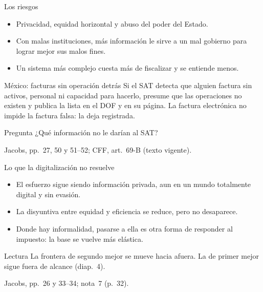 \documentclass[aspectratio=169,11pt]{beamer}
\newcommand{\fuente}[1]{\par\vfill{\small\color{cGris}#1\par}}
\begin{document}
\begin{frame}{Los riesgos}
  \begin{itemize}
    \item Privacidad, equidad horizontal y abuso del poder del Estado.
    \item Con malas instituciones, más información le sirve a un mal gobierno para lograr mejor sus malos fines.
    \item Un sistema más complejo cuesta más de fiscalizar y se entiende menos.
  \end{itemize}
  \pause
  \begin{block}{México: facturas sin operación detrás}
    Si el SAT detecta que alguien factura sin activos, personal ni capacidad para hacerlo, presume que las operaciones no existen y publica la lista en el DOF y en su página. La factura electrónica no impide la factura falsa: la deja registrada.
  \end{block}
  \pause
  \begin{alertblock}{Pregunta}
    ¿Qué información no le darían al SAT?
  \end{alertblock}
  \fuente{Jacobs, pp.~27, 50 y 51--52; CFF, art.~69-B (texto vigente).}
\end{frame}

\begin{frame}{Lo que la digitalización no resuelve}
  \begin{itemize}
    \item El esfuerzo sigue siendo información privada, aun en un mundo totalmente digital y sin evasión.
    \item La disyuntiva entre equidad y eficiencia se reduce, pero no desaparece.
    \item Donde hay informalidad, pasarse a ella es otra forma de responder al impuesto: la base se vuelve más elástica.
  \end{itemize}
  \pause
  \begin{block}{Lectura}
    La frontera de segundo mejor se mueve hacia afuera. La de primer mejor sigue fuera de alcance (diap.~4).
  \end{block}
  \fuente{Jacobs, pp.~26 y 33--34; nota~7 (p.~32).}
\end{frame}
\end{document}
